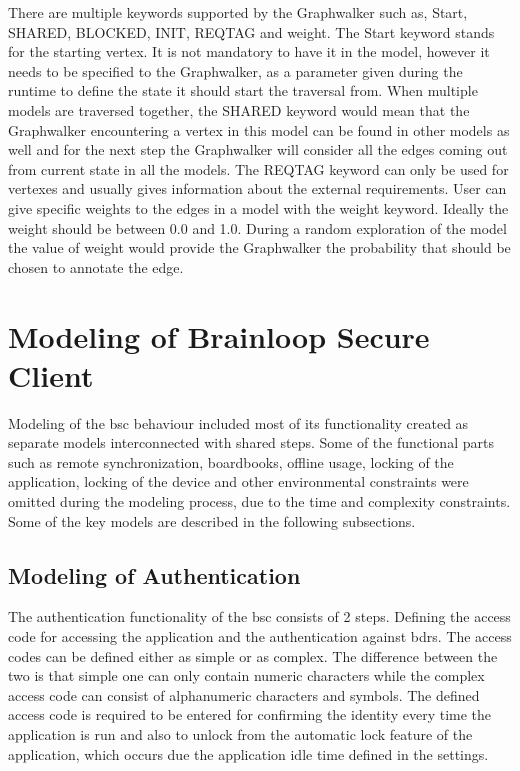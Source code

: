\par
There are multiple keywords supported by the Graphwalker such as, Start, SHARED, BLOCKED, INIT, REQTAG and weight. The Start keyword stands for the starting vertex. It is not mandatory to have it in the model, however it needs to be specified to the Graphwalker, as a parameter given during the runtime to define the state it should start the traversal from. When multiple models are traversed together, the SHARED keyword would mean that the Graphwalker encountering a vertex in this model can be found in other models as well and for the next step the Graphwalker will consider all the edges coming out from current state in all the models. The REQTAG keyword can only be used for vertexes and usually gives information about the external requirements. User can give specific weights to the edges in a model with the weight keyword. Ideally the weight should be between 0.0 and 1.0. During a random exploration of the model the value of weight would provide the Graphwalker the probability that should be chosen to annotate the edge.

\section{Modeling of Brainloop Secure Client}

\par
Modeling of the \acrshort{bsc} behaviour included  most of its functionality created as separate models interconnected with shared steps. Some of the functional parts such as remote synchronization, boardbooks, offline usage, locking of the application, locking of the device and other environmental constraints were omitted during the modeling process, due to the time and complexity constraints. Some of the key models are described in the following subsections.

\subsection{Modeling of Authentication}
\par
The authentication functionality of the \acrshort{bsc} consists of 2 steps. Defining the access code for accessing the application and the authentication against \acrshort{bdrs}. The access codes can be defined either as simple or as complex. The difference between the two is that simple one can only contain numeric characters while the complex access code can consist of alphanumeric characters and symbols. The defined access code is required to be entered for confirming the identity every time the application is run and also to unlock from the automatic lock feature of the application, which occurs due the application idle time defined in the settings.

